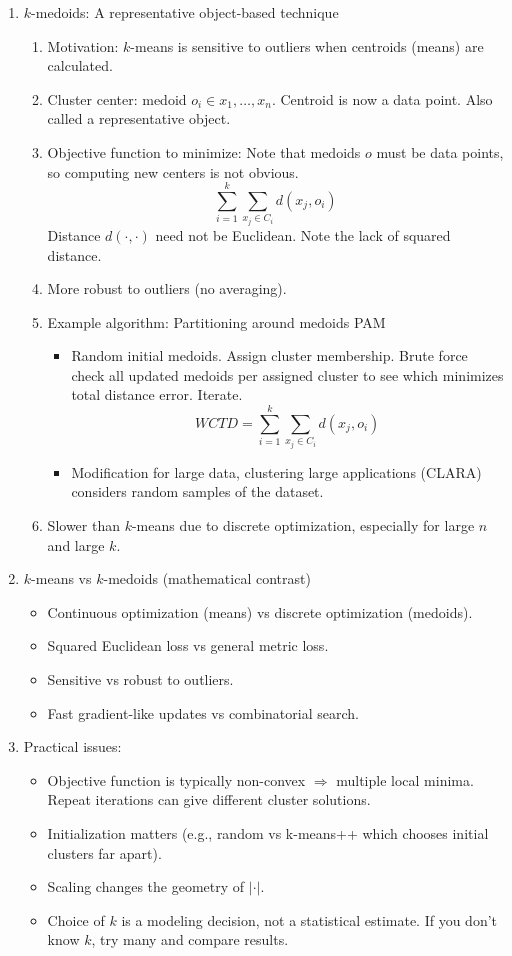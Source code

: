 \documentclass{article}
\begin{document}
\begin{enumerate}
\item $k$-medoids: A representative object-based technique
\begin{enumerate}
\item Motivation: $k$-means is sensitive to outliers when centroids (means) are calculated.
\item Cluster center: medoid $o_i \in {x_1,\dots,x_n}$. Centroid is now a data point. Also called a representative object.
\item Objective function to minimize: Note that medoids $o$ must be data points, so computing new centers is not obvious.
\[
\sum_{i=1}^k \sum_{x_j \in C_i} d(x_j , o_i)
\]
Distance $d(\cdot,\cdot)$ need not be Euclidean. Note the lack of squared distance.
\item More robust to outliers (no averaging).
\item Example algorithm: Partitioning around medoids PAM
\begin{itemize} 
\item Random initial medoids. Assign cluster membership. Brute force check all updated medoids per assigned cluster to see which minimizes total distance error. Iterate.
\[
WCTD = \sum_{i=1}^k \sum_{x_j \in C_i} d(x_j , o_i)
\]
\item Modification for large data, clustering large applications (CLARA) considers random samples of the dataset.
\end{itemize}
\item Slower than $k$-means due to discrete optimization, especially for large $n$ and large $k$.
\end{enumerate}

\item $k$-means vs $k$-medoids (mathematical contrast)
\begin{itemize}
\item Continuous optimization (means) vs discrete optimization (medoids).
\item Squared Euclidean loss vs general metric loss.
\item Sensitive vs robust to outliers.
\item Fast gradient-like updates vs combinatorial search.
\end{itemize}

\item Practical issues:
\begin{itemize}
\item Objective function is typically non-convex $\Rightarrow$ multiple local minima. Repeat iterations can give different cluster solutions.
\item Initialization matters (e.g., random vs k-means++ which chooses initial clusters far apart).
\item Scaling changes the geometry of $|\cdot|$.
\item Choice of $k$ is a modeling decision, not a statistical estimate. If you don't know $k$, try many and compare results.
\end{itemize}


\end{enumerate}
\end{document}
